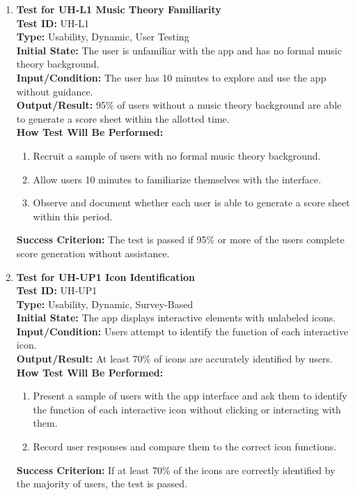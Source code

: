 \documentclass[12pt, titlepage]{article}
\begin{document}
\begin{enumerate}
    \item \textbf{Test for UH-L1 Music Theory Familiarity} \\
      \newline
      \textbf{Test ID:} UH-L1 \\
      \textbf{Type:} Usability, Dynamic, User Testing \\
      \textbf{Initial State:} The user is unfamiliar with the app and has no formal music theory background. \\
      \textbf{Input/Condition:} The user has 10 minutes to explore and use the app without guidance. \\
      \textbf{Output/Result:} 95\% of users without a music theory background are able to generate a score sheet within the allotted 
      time. \\
      \textbf{How Test Will Be Performed:}
      \begin{enumerate}
          \item Recruit a sample of users with no formal music theory background.
          \item Allow users 10 minutes to familiarize themselves with the interface.
          \item Observe and document whether each user is able to generate a score sheet within this period.
      \end{enumerate}
      \textbf{Success Criterion:} The test is passed if 95\% or more of the users complete score generation without assistance.

    \item \textbf{Test for UH-UP1 Icon Identification} \\
      \newline
      \textbf{Test ID:} UH-UP1 \\
      \textbf{Type:} Usability, Dynamic, Survey-Based \\
      \textbf{Initial State:} The app displays interactive elements with unlabeled icons. \\
      \textbf{Input/Condition:} Users attempt to identify the function of each interactive icon. \\
      \textbf{Output/Result:} At least 70\% of icons are accurately identified by users. \\
      \textbf{How Test Will Be Performed:}
      \begin{enumerate}
          \item Present a sample of users with the app interface and ask them to identify the function of each interactive icon 
          without clicking or interacting with them.
          \item Record user responses and compare them to the correct icon functions.
      \end{enumerate}
      \textbf{Success Criterion:} If at least 70\% of the icons are correctly identified by the majority of users, the test is passed.


\end{enumerate}
\end{document}
